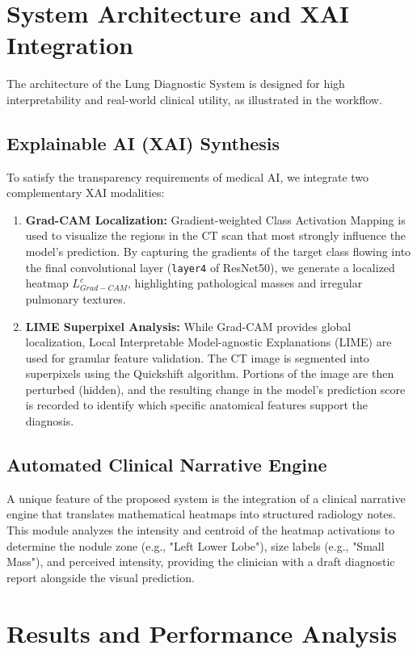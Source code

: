 \documentclass[conference]{IEEEtran}
\begin{document}
\section{System Architecture and XAI Integration}
The architecture of the Lung Diagnostic System is designed for high interpretability and real-world clinical utility, as illustrated in the workflow.
\subsection{Explainable AI (XAI) Synthesis}
To satisfy the transparency requirements of medical AI, we integrate two complementary XAI modalities:
\begin{enumerate}
    \item \textbf{Grad-CAM Localization:} Gradient-weighted Class Activation Mapping is used to visualize the regions in the CT scan that most strongly influence the model's prediction. By capturing the gradients of the target class flowing into the final convolutional layer (\texttt{layer4} of ResNet50), we generate a localized heatmap $L_{Grad-CAM}^c$, highlighting pathological masses and irregular pulmonary textures.
    
    \item \textbf{LIME Superpixel Analysis:} While Grad-CAM provides global localization, Local Interpretable Model-agnostic Explanations (LIME) are used for granular feature validation. The CT image is segmented into superpixels using the Quickshift algorithm. Portions of the image are then perturbed (hidden), and the resulting change in the model's prediction score is recorded to identify which specific anatomical features support the diagnosis.
\end{enumerate}
\subsection{Automated Clinical Narrative Engine}
A unique feature of the proposed system is the integration of a clinical narrative engine that translates mathematical heatmaps into structured radiology notes. This module analyzes the intensity and centroid of the heatmap activations to determine the nodule zone (e.g., "Left Lower Lobe"), size labels (e.g., "Small Mass"), and perceived intensity, providing the clinician with a draft diagnostic report alongside the visual prediction.
\section{Results and Performance Analysis}
\end{document}

